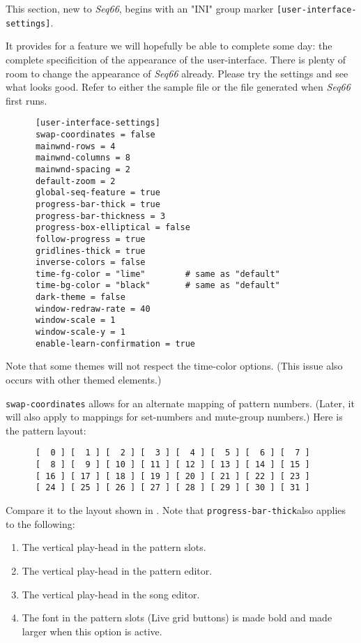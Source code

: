    This section, new to \textsl{Seq66}, begins with an
   "INI" group marker \texttt{[user-interface-settings]}.

   It provides for a feature we will hopefully be able to complete some day:
   the complete specificition of the appearance of the user-interface.
   There is plenty of room to change the appearance of
   \textsl{Seq66} already.
   Please try the settings and see what looks good.
   Refer to either the sample file or the file generated when \textsl{Seq66}
   first runs.

   \begin{verbatim}
      [user-interface-settings]
      swap-coordinates = false
      mainwnd-rows = 4
      mainwnd-columns = 8
      mainwnd-spacing = 2
      default-zoom = 2
      global-seq-feature = true
      progress-bar-thick = true
      progress-bar-thickness = 3
      progress-box-elliptical = false
      follow-progress = true
      gridlines-thick = true
      inverse-colors = false
      time-fg-color = "lime"        # same as "default"
      time-bg-color = "black"       # same as "default"
      dark-theme = false
      window-redraw-rate = 40
      window-scale = 1
      window-scale-y = 1
      enable-learn-confirmation = true
   \end{verbatim}

   Note that some themes will not respect the time-color options.
   (This issue also occurs with other themed elements.)

   \texttt{swap-coordinates} allows for an alternate mapping of pattern
   numbers.  (Later, it will also apply to mappings for set-numbers and
   mute-group numbers.)  Here is the pattern layout:

   \begin{verbatim}
      [  0 ] [  1 ] [  2 ] [  3 ] [  4 ] [  5 ] [  6 ] [  7 ]
      [  8 ] [  9 ] [ 10 ] [ 11 ] [ 12 ] [ 13 ] [ 14 ] [ 15 ]
      [ 16 ] [ 17 ] [ 18 ] [ 19 ] [ 20 ] [ 21 ] [ 22 ] [ 23 ]
      [ 24 ] [ 25 ] [ 26 ] [ 27 ] [ 28 ] [ 29 ] [ 30 ] [ 31 ]
   \end{verbatim}

   Compare it to the layout shown in
   .
   Note that \texttt{progress-bar-thick}also applies to the following:

   \begin{enumerate}
      \item The vertical play-head in the pattern slots.
      \item The vertical play-head in the pattern editor.
      \item The vertical play-head in the song editor.
      \item The font in the pattern slots (Live grid buttons)
         is made bold and made larger when this option is active.
   \end{enumerate}

